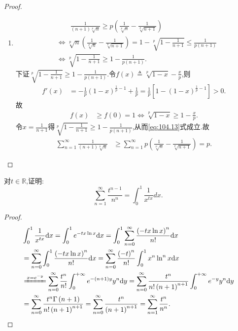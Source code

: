 \documentclass[../../main.tex]{subfiles}
\begin{document}
\begin{proof}
\begin{enumerate}
\item \begin{align}
&\quad \quad \frac{1}{\left( n+1 \right) \sqrt[p]{n}}\geqslant p\left( \frac{1}{\sqrt[p]{n}}-\frac{1}{\sqrt[p]{n+1}} \right) \label{eq:104.13} \\
&\Longleftrightarrow \sqrt[p]{n}\left( \frac{1}{\sqrt[p]{n}}-\frac{1}{\sqrt[p]{n+1}} \right) =1-\sqrt[p]{1-\frac{1}{n+1}}\leqslant \frac{1}{p\left( n+1 \right)}\nonumber \\
&\Longleftrightarrow \sqrt[p]{1-\frac{1}{n+1}}\geqslant 1-\frac{1}{p\left( n+1 \right)}.\nonumber
\end{align}
下证$\sqrt[p]{1-\frac{1}{n+1}}\geqslant 1-\frac{1}{p\left( n+1 \right)}$.令$f\left( x \right) \triangleq \sqrt[p]{1-x}-\frac{x}{p}$,则
\begin{align*}
f\prime \left( x \right) &=-\frac{1}{p}\left( 1-x \right) ^{\frac{1}{p}-1}+\frac{1}{p}=\frac{1}{p}\left[ 1-\left( 1-x \right) ^{\frac{1}{p}-1} \right] >0.
\end{align*}
故
\begin{align*}
f\left( x \right) &\geqslant f\left( 0 \right) =1\Longleftrightarrow \sqrt[p]{1-x}\geqslant 1-\frac{x}{p}.
\end{align*}
令$x=\frac{1}{n+1}$得$\sqrt[p]{1-\frac{1}{n+1}}\geqslant 1-\frac{1}{p\left( n+1 \right)}$,从而\eqref{eq:104.13}式成立.故
\begin{align*}
\sum_{n=1}^{\infty}{\frac{1}{\left( n+1 \right) \sqrt[p]{n}}}&\geqslant \sum_{n=1}^{\infty}{p\left( \frac{1}{\sqrt[p]{n}}-\frac{1}{\sqrt[p]{n+1}} \right)}=p.
\end{align*}
\end{enumerate}
\end{proof}

\begin{example}
对$t \in \mathbb{R}$,证明:
$$\sum_{n=1}^\infty \frac{t^{n-1}}{n^n}=\int_0^1 \frac{1}{x^{tx}}dx.$$
\end{example}
\begin{proof}
\begin{align*}
&\int_0^1{\frac{1}{x^{tx}}\mathrm{d}x}=\int_0^1{e^{-tx\ln x}\mathrm{d}x}=\int_0^1{\sum_{n=0}^{\infty}{\frac{\left( -tx\ln x \right) ^n}{n!}\mathrm{d}x}}
\\
&=\sum_{n=0}^{\infty}{\int_0^1{\frac{\left( -tx\ln x \right) ^n}{n!}\mathrm{d}x}}=\sum_{n=0}^{\infty}{\frac{\left( -t \right) ^n}{n!}\int_0^1{x^n\ln ^nx\mathrm{d}x}}
\\
&\xlongequal{x=e^{-y}}\sum_{n=0}^{\infty}{\frac{t^n}{n!}\int_0^{+\infty}{e^{-\left( n+1 \right) y}y^n\mathrm{d}y}}=\sum_{n=0}^{\infty}{\frac{t^n}{n!\left( n+1 \right) ^{n+1}}\int_0^{+\infty}{e^{-y}y^n\mathrm{d}y}}
\\
&=\sum_{n=0}^{\infty}{\frac{t^n\Gamma \left( n+1 \right)}{n!\left( n+1 \right) ^{n+1}}}=\sum_{n=0}^{\infty}{\frac{t^n}{\left( n+1 \right) ^{n+1}}}=\sum_{n=1}^{\infty}{\frac{t^n}{n^n}}.
\end{align*}
\end{proof}
\end{document}
